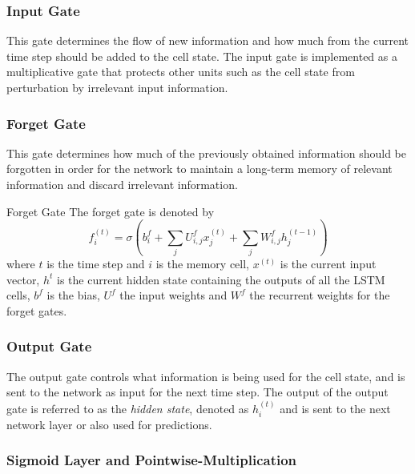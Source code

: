             \subsubsection{Input Gate} 
            
                This gate determines the flow of new information and how much from the current time step should be added to the cell state. The input gate is implemented as a multiplicative gate that protects other units such as the cell state from perturbation by irrelevant input information.

            \subsubsection{Forget Gate}

                This gate determines how much of the previously obtained information should be forgotten in order for the network to maintain a long-term memory of relevant information and discard irrelevant information.
                \begin{pabox}{Forget Gate}
                    \label{def:lstm-forget-gate-definition}
                    The forget gate is denoted by $$f_i^{(t)} = \sigma \left(b_i^f + \sum_{j} U_{i, j}^f x_j^{(t)} + \sum_{j} W_{i, j}^f h_j^{(t - 1)}\right)$$ where $t$ is the time step and $i$ is the memory cell, $x^{(t)}$ is the current input vector, $h^{t}$ is the current hidden state containing the outputs of all the LSTM cells, $b^f$ is the bias, $U^f$ the input weights and $W^f$ the recurrent weights for the forget gates.
                \end{pabox}
                

                

            \subsubsection{Output Gate}

                The output gate controls what information is being used for the cell state, and is sent to the network as input for the next time step. The output of the output gate is referred to as the \emph{hidden state}, denoted as $h_i^{(t)}$ and is sent to the next network layer or also used for predictions.



            \subsubsection{Sigmoid Layer and Pointwise-Multiplication}
            \label{sec:sigmoid-layer-and-pointwise-multiplication}

